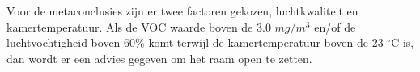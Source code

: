 Voor de metaconclusies zijn er twee factoren gekozen, luchtkwaliteit en kamertemperatuur. Als de VOC waarde boven de 3.0 \(mg/m^3\)  \cite{voc-luchtkwaliteit} en/of de luchtvochtigheid boven 60\%\cite{palonen1993effects} komt terwijl de kamertemperatuur boven de 23 $^{\circ}$C\cite{palonen1993effects} is, dan wordt er een advies gegeven om het raam open te zetten. 






